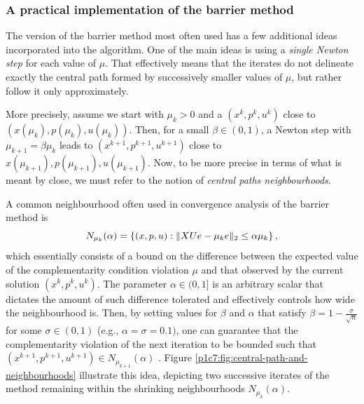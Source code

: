 \subsubsection{A practical implementation of the barrier method}

The version of the barrier method most often used has a few additional ideas incorporated into the algorithm. One of the main ideas is using a \emph{single Newton step} for each value of $\mu$. That effectively means that the iterates do not delineate exactly the central path formed by successively smaller values of $\mu$, but rather follow it only approximately. 

More precisely, assume we start with $\mu_k > 0$ and a $(x^k, p^k, u^k)$ close to $(x(\mu_k), p(\mu_k), u(\mu_k))$. Then, for a small $\beta \in (0,1)$, a Newton step with $\mu_{k+1} = \beta \mu_k$ leads to $(x^{k+1}, p^{k+1}, u^{k+1})$ close to $x(\mu_{k+1}), p(\mu_{k+1}), u(\mu_{k+1})$. Now, to be more precise in terms of what is meant by close, we must refer to the notion of \emph{central paths neighbourhoods}.

A common neighbourhood often used in convergence analysis of the barrier method is
	\begin{equation*}
		N_{\mu_k}(\alpha) =  \left\{ (x, p, u) : \|X  U e - \mu_k e \|_2 \leq \alpha \mu_k \right \},
	\end{equation*} 
	which essentially consists of a bound on the difference between the expected value of the complementarity condition violation $\mu$ and that observed by the current solution $(x^k, p^k, u^k)$. The parameter $\alpha \in (0,1]$ is an arbitrary scalar that dictates the amount of such difference tolerated and effectively controls how wide the neighbourhood is. Then, by setting values for $\beta$ and $\alpha$ that satisfy $\beta = 1 - \frac{\sigma}{\sqrt{n}}$ for some $\sigma \in (0,1)$ (e.g., $\alpha = \sigma = 0.1)$, one can guarantee that the complementarity violation of the next iteration to be bounded such that $(x^{k+1}, p^{k+1}, u^{k+1}) \in N_{\mu_{k+1}}(\alpha)$ \cite{gondzio2012interior}. Figure \ref{p1c7:fig:central-path-and-neighbourhoods} illustrate this idea, depicting two successive iterates of the method remaining within the shrinking neighbourhoods $N_{\mu_k}(\alpha)$. 
	
